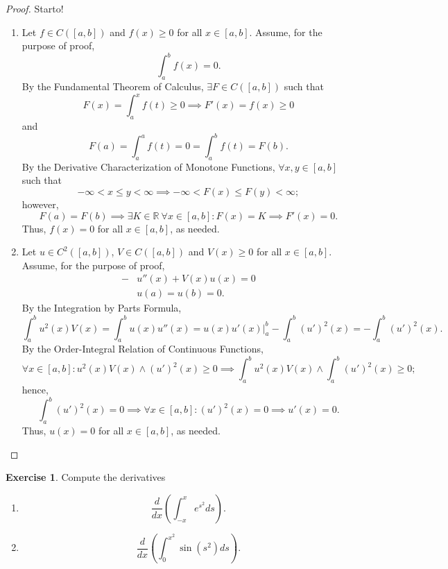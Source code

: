 \documentclass[12pt]{article}
\theoremstyle{definition}
\newtheorem{exercise}{Exercise}
\begin{document}
\begin{proof}
    Starto!
    \begin{enumerate}[label=(\alph*)]
        \item Let \(f \in C([a, b])\) and \(f(x) \geq 0\) for all \(x \in [a, b]\). Assume, for the purpose of proof, 
        \[
            \int_{a}^{b} f(x) = 0.
        \]
        By the Fundamental Theorem of Calculus, \(\exists F \in C([a, b])\) such that
        \[
            F(x) = \int_{a}^{x} f(t) \geq 0 \implies F'(x) = f(x) \geq 0
        \]
        and
        \[
            F(a) = \int_{a}^{a} f(t) = 0 = \int_{a}^{b} f(t) = F(b).
        \]
        By the Derivative Characterization of Monotone Functions, \(\forall x, y \in [a, b]\) such that
        \[
            - \infty < x \leq y < \infty \implies -\infty < F(x) \leq F(y) < \infty;
        \]
        however,
        \[
            F(a) = F(b) \implies \exists K \in \mathbb{R} \ \forall x \in [a, b] : F(x) = K \implies F'(x) = 0.
        \]
        Thus, \(f(x) = 0\) for all \(x \in [a, b]\), as needed.
        \item Let \(u \in C^2([a, b])\), \(V \in C([a, b])\) and \(V(x) \geq 0\) for all \(x \in [a, b]\). Assume, for the purpose of proof,
        \begin{align*}
            -&u''(x) + V(x)u(x) = 0 \\
            &u(a) = u(b) = 0.
        \end{align*}
        By the Integration by Parts Formula,
        \[
            \int_{a}^{b} u^2(x)V(x) = \int_{a}^{b}u(x)u''(x) = u(x)u'(x) \bigg\vert_{a}^{b} - \int_{a}^{b}(u')^2(x) = - \int_{a}^{b} (u')^2(x).
        \]
        By the Order-Integral Relation of Continuous Functions,
        \[
            \forall x \in [a, b] : u^2(x)V(x) \land (u')^2(x) \geq 0 \implies \int_{a}^{b} u^2(x)V(x) \land \int_{a}^{b} (u')^2(x) \geq 0;
        \]
        hence,
        \[
            \int_{a}^{b}(u')^2(x) = 0 \implies \forall x \in [a, b] : (u')^2(x) = 0 \implies u'(x) = 0.
        \]
        Thus, \(u(x) = 0\) for all \(x \in [a, b]\), as needed.
    \end{enumerate}
\end{proof}

\begin{exercise}
    Compute the derivatives
    \begin{enumerate}[label=(\alph*)]
        \item
        \[
            \frac{d}{dx}\left(\int_{-x}^{x}e^{s^2}ds\right).
        \]
        \item 
        \[
            \frac{d}{dx}\left(\int_{0}^{x^2}\sin(s^2)ds\right).
        \]
    \end{enumerate}
\end{exercise}
\end{document}

